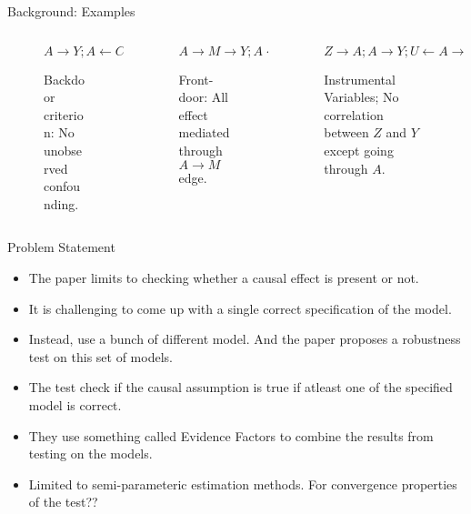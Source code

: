 \documentclass{beamer}
\begin{document}
\begin{frame}{Background: Examples}
	\begin{columns}
		\begin{column}{0.33 \textwidth}
			\center
			\begin{figure}
				$ A \rightarrow Y; A \leftarrow C \rightarrow Y $
				\caption{Backdoor criterion: No unobserved confounding.}
			\end{figure}
		\end{column}
		\begin{column}{0.33 \textwidth}
			\center
			\begin{figure}
				$ A \rightarrow M \rightarrow Y; A \leftarrow U \rightarrow Y  $
				\caption{Front-door: All effect mediated through $ A \rightarrow M $ edge.}
			\end{figure}
		\end{column}
		\begin{column}{0.33 \textwidth}
			\center
			\begin{figure}
				$ Z \rightarrow A; A \rightarrow Y; U \leftarrow A \rightarrow Y $
				\caption{Instrumental Variables; No correlation between $ Z $ and $ Y $ except going through $ A $.}
			\end{figure}
		\end{column}
	\end{columns}
\end{frame}

\begin{frame}{Problem Statement}
	\begin{itemize}
		\item The paper limits to checking whether a causal effect is present or not.
		\item It is challenging to come up with a single correct specification of the model.
		\item Instead, use a bunch of different model. And the paper proposes a robustness test on this set of models.
		\item The test check if the causal assumption is true if atleast one of the specified model is correct.
		\item They use something called Evidence Factors to combine the results from testing on the models.
		\item Limited to semi-parameteric estimation methods. For convergence properties of the test??
	\end{itemize}
\end{frame}
\end{document}
